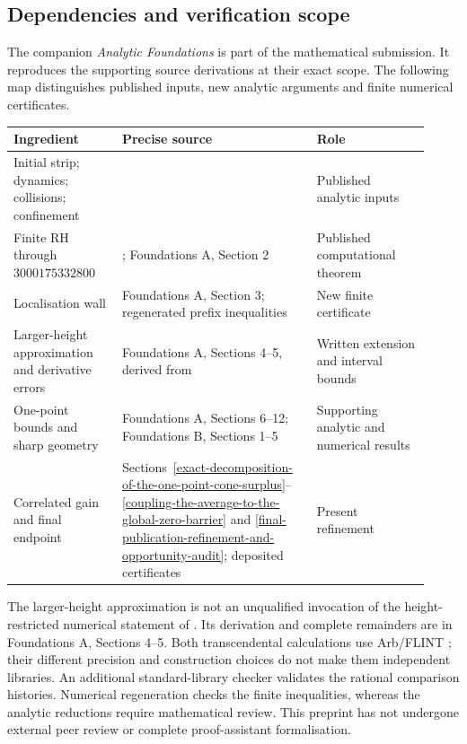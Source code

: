 \documentclass[11pt,a4paper]{article}
\begin{document}
\subsection{Dependencies and verification scope}
The companion \emph{Analytic Foundations} is part of the mathematical
submission. It reproduces the supporting source derivations at their exact
scope. The following map distinguishes published inputs, new analytic
arguments and finite numerical certificates.
\begin{center}
\small
\begin{tabular}{@{}p{0.24\linewidth}p{0.43\linewidth}p{0.25\linewidth}@{}}
\toprule
Ingredient & Precise source & Role \\
\midrule
Initial strip; dynamics; collisions; confinement &
\cite[Proposition 3.1; Theorems 3.2 and 1.5(i)]{polymath} & Published analytic inputs \\
Finite RH through $3000175332800$ &
\cite[Theorem 1]{pt}; Foundations A, Section 2 & Published computational theorem \\
Localisation wall & Foundations A, Section 3; regenerated prefix inequalities & New finite certificate \\
Larger-height approximation and derivative errors & Foundations A, Sections 4--5, derived from \cite[Section 6]{polymath} & Written extension and interval bounds \\
One-point bounds and sharp geometry & Foundations A, Sections 6--12; Foundations B, Sections 1--5 & Supporting analytic and numerical results \\
Correlated gain and final endpoint & Sections~\ref{exact-decomposition-of-the-one-point-cone-surplus}--\ref{coupling-the-average-to-the-global-zero-barrier} and \ref{final-publication-refinement-and-opportunity-audit}; deposited certificates & Present refinement \\
\bottomrule
\end{tabular}
\end{center}

The larger-height approximation is not an unqualified invocation of the
height-restricted numerical statement of \cite[Theorem 1.3]{polymath}.
Its derivation and complete remainders are in Foundations A, Sections 4--5.
Both transcendental calculations use Arb/FLINT \cite{arb}; their different
precision and construction choices do not make them independent libraries.
An additional standard-library checker validates the rational comparison
histories. Numerical regeneration checks the finite inequalities, whereas
the analytic reductions require mathematical review. This preprint has not
undergone external peer review or complete proof-assistant formalisation.
\end{document}
